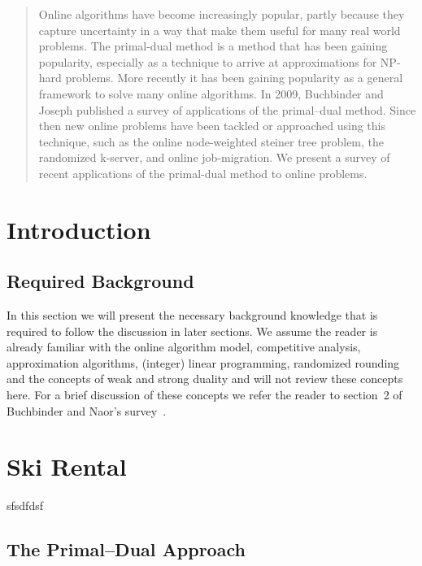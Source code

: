 \documentclass[10pt, twocolumn]{article}
\begin{document}
\maketitle

\begin{abstract}
Online algorithms have become increasingly popular, partly because they capture uncertainty in a way that make them useful for many real world problems. The primal-dual method is a method that has been gaining popularity, especially as a technique to arrive at approximations for NP-hard problems.  More recently it has been gaining popularity as a general framework to solve many online algorithms. In 2009, Buchbinder and Joseph published a survey of applications of the primal--dual method. Since then new online problems have been tackled or approached using this technique, such as the online node-weighted steiner tree problem, the randomized k-server, and online job-migration. We present a survey of recent applications of the primal-dual method to online problems.
\end{abstract}

\section{Introduction}

\subsection{Required Background}

In this section we will present the necessary background knowledge that is required to follow the discussion in later sections. We assume the reader is already familiar with the online algorithm model, competitive analysis, approximation algorithms, (integer) linear programming, randomized rounding and the concepts of weak and strong duality and will not review these concepts here. For a brief discussion of these concepts we refer the reader to section~2 of Buchbinder and Naor's survey~\cite{buchbinder09:survey}.



\section{Ski Rental}

sfsdfdsf

\subsection{The Primal--Dual Approach}
\end{document}
